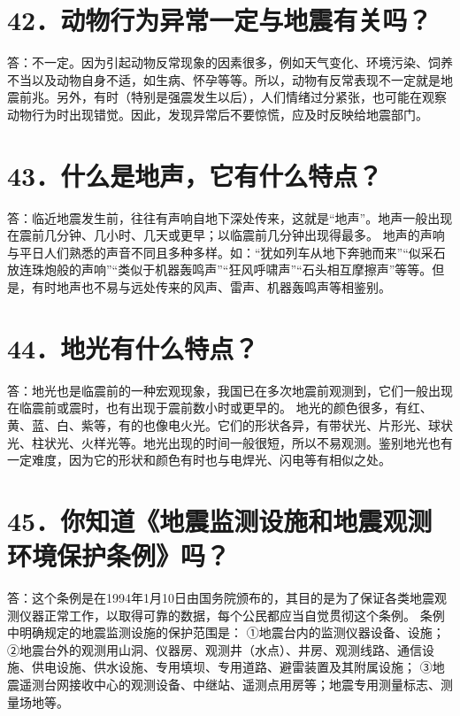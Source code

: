 \documentclass[a4paper,12pt,english]{sphinxmanual}
\begin{document}
\section{42．动物行为异常一定与地震有关吗？}
\label{\detokenize{index:id48}}
答：不一定。因为引起动物反常现象的因素很多，例如天气变化、环境污染、饲养不当以及动物自身不适，如生病、怀孕等等。所以，动物有反常表现不一定就是地震前兆。另外，有时（特别是强震发生以后），人们情绪过分紧张，也可能在观察动物行为时出现错觉。因此，发现异常后不要惊慌，应及时反映给地震部门。


\section{43．什么是地声，它有什么特点？}
\label{\detokenize{index:id49}}
答：临近地震发生前，往往有声响自地下深处传来，这就是“地声”。地声一般出现在震前几分钟、几小时、几天或更早；以临震前几分钟出现得最多。
地声的声响与平日人们熟悉的声音不同且多种多样。如：“犹如列车从地下奔驰而来”“似采石放连珠炮般的声响”“类似于机器轰鸣声”“狂风呼啸声”“石头相互摩擦声”等等。但是，有时地声也不易与远处传来的风声、雷声、机器轰鸣声等相鉴别。


\section{44．地光有什么特点？}
\label{\detokenize{index:id50}}
答：地光也是临震前的一种宏观现象，我国已在多次地震前观测到，它们一般出现在临震前或震时，也有出现于震前数小时或更早的。
地光的颜色很多，有红、黄、蓝、白、紫等，有的也像电火光。它们的形状各异，有带状光、片形光、球状光、柱状光、火样光等。地光出现的时间一般很短，所以不易观测。鉴别地光也有一定难度，因为它的形状和颜色有时也与电焊光、闪电等有相似之处。


\section{45．你知道《地震监测设施和地震观测环境保护条例》吗？}
\label{\detokenize{index:id51}}
答：这个条例是在1994年1月10日由国务院颁布的，其目的是为了保证各类地震观测仪器正常工作，以取得可靠的数据，每个公民都应当自觉贯彻这个条例。
条例中明确规定的地震监测设施的保护范围是：
①地震台内的监测仪器设备、设施；
②地震台外的观测用山洞、仪器房、观测井（水点）、井房、观测线路、通信设施、供电设施、供水设施、专用填坝、专用道路、避雷装置及其附属设施；
③地震遥测台网接收中心的观测设备、中继站、遥测点用房等；地震专用测量标志、测量场地等。
\end{document}
